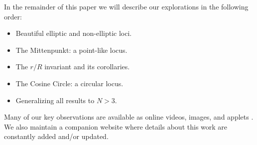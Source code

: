 In the remainder of this paper we will describe our explorations in the following order:

\begin{itemize}
    \item Beautiful elliptic and non-elliptic loci.
    \item The Mittenpunkt: a point-like locus.
    \item The $r/R$ invariant and its corollaries.
    \item The Cosine Circle: a circular locus.
    \item Generalizing all results to $N>3$.
\end{itemize}

Many of our key observations are available as online videos, images, and applets \cite{reznik_media}. We also maintain a companion website \cite{reznik_web} where details about this work are constantly added and/or updated.